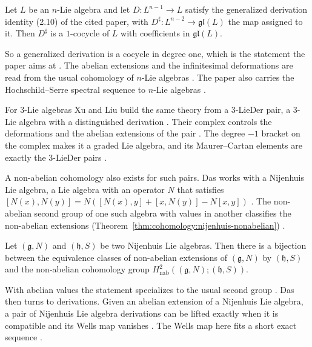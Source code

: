 \begin{theorem}\label{thm:cohomology:n-lie-derivation}
Let $L$ be an $n$-Lie algebra and let $D\colon L^{n-1}\to L$ satisfy the
generalized derivation identity (2.10) of the cited paper, with
$D^{\sharp}\colon L^{n-2}\to\mathfrak{gl}(L)$ the map assigned to it. Then
$D^{\sharp}$ is a $1$-cocycle of $L$ with coefficients in
$\mathfrak{gl}(L)$.
\end{theorem}

So a generalized derivation is a cocycle in degree one, which is the
statement the paper aims at \cite[p.~2]{AtesliEsenSutlu2021}. The abelian
extensions and the infinitesimal deformations are read from the usual
cohomology of $n$-Lie algebras \cite[p.~1]{AtesliEsenSutlu2021}. The paper
also carries the Hochschild--Serre spectral sequence to $n$-Lie algebras
\cite[p.~1]{AtesliEsenSutlu2021}.

For $3$-Lie algebras Xu and Liu build the same theory from a $3$-LieDer pair,
a $3$-Lie algebra with a distinguished derivation
\cite[p.~1]{XuLiu2021ThreeLieDer}. Their complex controls the deformations
and the abelian extensions of the pair
\cite[p.~1]{XuLiu2021ThreeLieDer}. The degree $-1$ bracket on the complex
makes it a graded Lie algebra, and its Maurer--Cartan elements are exactly
the $3$-LieDer pairs \cite[p.~2]{XuLiu2021ThreeLieDer}.

A non-abelian cohomology also exists for such pairs. Das works with a
Nijenhuis Lie algebra, a Lie algebra with an operator $N$ that satisfies
$[N(x),N(y)]=N([N(x),y]+[x,N(y)]-N[x,y])$
\cite[Definition~2.1, p.~3]{Das2025Nijenhuis}. The non-abelian second group
of one such algebra with values in another classifies the non-abelian
extensions (Theorem~\ref{thm:cohomology:nijenhuis-nonabelian}) \cite[p.~2]{Das2025Nijenhuis}.

\begin{theorem}\label{thm:cohomology:nijenhuis-nonabelian}
Let $(\mathfrak{g},N)$ and $(\mathfrak{h},S)$ be two Nijenhuis Lie algebras.
Then there is a bijection between the equivalence classes of non-abelian
extensions of $(\mathfrak{g},N)$ by $(\mathfrak{h},S)$ and the non-abelian
cohomology group $H^{2}_{\mathrm{nab}}((\mathfrak{g},N);(\mathfrak{h},S))$.
\end{theorem}

With abelian values the statement specializes to the usual second group
\cite[Theorem~3.7, p.~7]{Das2025Nijenhuis}. Das then turns to derivations.
Given an abelian extension of a Nijenhuis Lie algebra, a pair of Nijenhuis
Lie algebra derivations can be lifted exactly when it is compatible and its
Wells map vanishes \cite[Theorem~5.4, p.~19]{Das2025Nijenhuis}. The Wells map
here fits a short exact sequence \cite[Theorem~5.5, p.~20]{Das2025Nijenhuis}.


